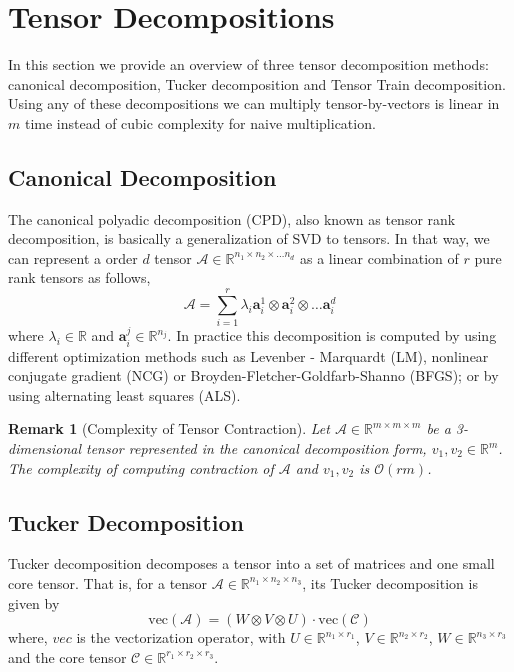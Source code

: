 \documentclass[conference]{IEEEtran}
\newtheorem{remark}[definition]{Remark}
\newcommand{\R}{\mathbb{R}}
\begin{document}
\section{Tensor Decompositions}
In this section we provide an overview of three tensor decomposition methods: canonical decomposition, Tucker decomposition and Tensor Train decomposition. Using any of these decompositions we can multiply tensor-by-vectors is linear in $m$ time instead of cubic complexity for naive multiplication. 

\subsection{Canonical Decomposition}
The canonical polyadic decomposition (CPD), also known as tensor rank decomposition, is basically a generalization of SVD to tensors. In that way, we can represent a order $d$ tensor $\mathcal{A} \in \mathbb{R}^{n_1 \times n_2 \times \dots n_d } $ as a linear combination of $r$ pure rank tensors as follows,
$$ \mathcal{A} = \sum_{i=1}^r \lambda_i \textbf{a}_i^1 \otimes \textbf{a}_i^2 \otimes \dots \textbf{a}_i^d $$
where $\lambda_i \in \mathbb{R} $ and $\textbf{a}_i^j \in \mathbb{R}^{n_j}$. In practice this decomposition is computed by using different optimization methods such as Levenber - Marquardt (LM), nonlinear conjugate gradient (NCG) or Broyden-Fletcher-Goldfarb-Shanno (BFGS); or by using alternating least squares (ALS).


\begin{remark}[Complexity of Tensor Contraction]
Let $\mathcal{A} \in \R^{m\times m\times m}$ be a 3-dimensional tensor represented in the canonical decomposition form, $v_1, v_2 \in \R^m$. The complexity of computing contraction of $\mathcal{A}$ and $v_1, v_2$ is $\mathcal{O}(rm)$.
\end{remark}

\subsection{Tucker Decomposition}
Tucker decomposition decomposes a tensor into a set of matrices and one small core tensor. That is, for a tensor $\mathcal{A} \in \mathbb{R}^{ n_1 \times n_2 \times n_3} $, its Tucker decomposition is given by
$$ \text{vec} ( \mathcal{A}  ) =  \left( W \otimes V \otimes U \right) \cdot \text{vec} ( \mathcal{C} ) $$
where, $vec$ is the vectorization operator, with $U \in \mathbb{R}^{n_1\times r_1}$, $V \in \mathbb{R}^{n_2\times r_2}$, $W \in \mathbb{R}^{n_3\times r_3}$ and the core tensor $\mathcal{C}\in \mathbb{R}^{r_1 \times r_2 \times r_3}$.
\end{document}

